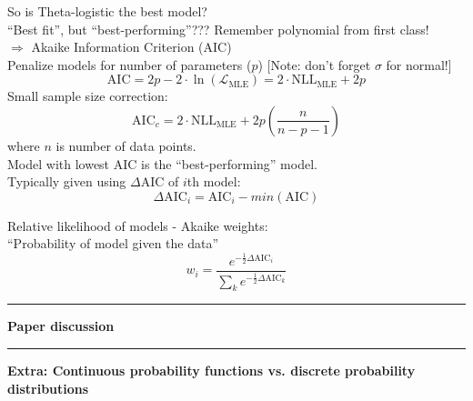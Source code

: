 \documentclass{article}
\newcommand{\ind}{\-\hspace{1cm}}
\begin{document}
So is Theta-logistic the best model?\\
\ind ``Best fit'', but ``best-performing''???  Remember polynomial from first class!\\

$\Rightarrow$ Akaike Information Criterion (AIC)\\
\ind Penalize models for number of parameters ($p$) [Note: don't forget $\sigma$ for normal!]
\begin{equation*}
	\text{AIC} = 2p - 2\cdot \ln(\mathcal{L}_{\text{MLE}}) = 2 \cdot \text{NLL}_{\text{MLE}} + 2p
\end{equation*}
Small sample size correction:
\begin{equation*}
	\text{AIC}_c = 2 \cdot \text{NLL}_{\text{MLE}} + 2p \left(\frac{n}{n-p-1}\right)
\end{equation*}
\ind where $n$ is number of data points.\\

Model with lowest AIC is the ``best-performing'' model.\\
Typically given using $\Delta$AIC of $i$th model:
\begin{equation*}
\Delta \text{AIC}_i = \text{AIC}_i - min(\text{AIC})
\end{equation*}

Relative likelihood of models - Akaike weights:\\
``Probability of model given the data''
\begin{equation*}
	w_i = \frac{e^{-\frac{1}{2} \Delta \text{AIC}_i}}{\sum_k e^{-\frac{1}{2} \Delta \text{AIC}_k}}
\end{equation*}


\rule[0.5ex]{\linewidth}{1pt}
\textbf{Paper discussion}\\
\rule[0.5ex]{\linewidth}{1pt}

\pagebreak

\textbf{Extra: Continuous probability functions vs. discrete probability distributions}
\end{document}
